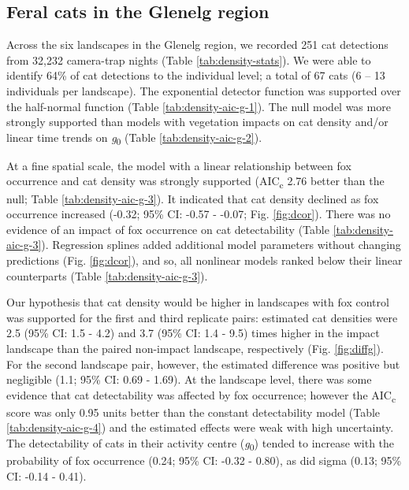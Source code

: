 \documentclass[11pt,a4paper,titlepage,twoside,openright]{style/unimelbthesis}
\begin{document}
\begin{mainmatter}
\hypertarget{feral-cats-in-the-glenelg-region}{%
\subsection{Feral cats in the Glenelg region}\label{feral-cats-in-the-glenelg-region}}

Across the six landscapes in the Glenelg region, we recorded 251 cat detections from 32,232 camera-trap nights (Table \ref{tab:density-stats}). We were able to identify 64\% of cat detections to the individual level; a total of 67 cats (6 -- 13 individuals per landscape). The exponential detector function was supported over the half-normal function (Table \ref{tab:density-aic-g-1}). The null model was more strongly supported than models with vegetation impacts on cat density and/or linear time trends on \emph{g}\textsubscript{0} (Table \ref{tab:density-aic-g-2}).

At a fine spatial scale, the model with a linear relationship between fox occurrence and cat density was strongly supported (AIC\textsubscript{c} 2.76 better than the null; Table \ref{tab:density-aic-g-3}). It indicated that cat density declined as fox occurrence increased (-0.32; 95\% CI: -0.57 - -0.07; Fig. \ref{fig:dcor}). There was no evidence of an impact of fox occurrence on cat detectability (Table \ref{tab:density-aic-g-3}). Regression splines added additional model parameters without changing predictions (Fig. \ref{fig:dcor}), and so, all nonlinear models ranked below their linear counterparts (Table \ref{tab:density-aic-g-3}).

Our hypothesis that cat density would be higher in landscapes with fox control was supported for the first and third replicate pairs: estimated cat densities were 2.5 (95\% CI: 1.5 - 4.2) and 3.7 (95\% CI: 1.4 - 9.5) times higher in the impact landscape than the paired non-impact landscape, respectively (Fig. \ref{fig:diffg}). For the second landscape pair, however, the estimated difference was positive but negligible (1.1; 95\% CI: 0.69 - 1.69). At the landscape level, there was some evidence that cat detectability was affected by fox occurrence; however the AIC\textsubscript{c} score was only 0.95 units better than the constant detectability model (Table \ref{tab:density-aic-g-4}) and the estimated effects were weak with high uncertainty. The detectability of cats in their activity centre (\emph{g}\textsubscript{0}) tended to increase with the probability of fox occurrence (0.24; 95\% CI: -0.32 - 0.80), as did sigma (0.13; 95\% CI: -0.14 - 0.41).


\end{mainmatter}
\end{document}
